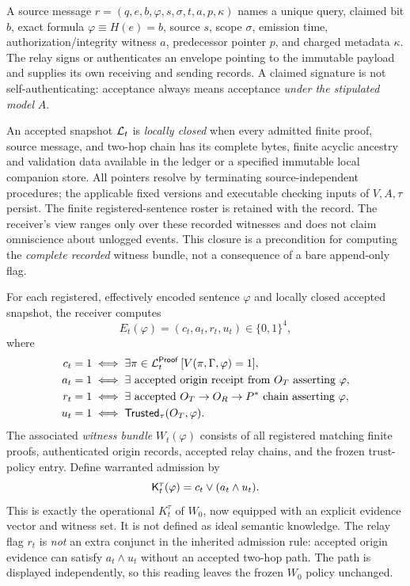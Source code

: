 \documentclass[11pt,letterpaper]{article}
\begin{document}
A source message $r=(q,e,b,\varphi,s,\sigma,t,a,p,\kappa)$ names a unique query, claimed bit $b$, exact formula $\varphi\equiv H(e)=b$, source $s$, scope $\sigma$, emission time, authorization/integrity witness $a$, predecessor pointer $p$, and charged metadata $\kappa$. The relay signs or authenticates an envelope pointing to the immutable payload and supplies its own receiving and sending records. A claimed signature is not self-authenticating: acceptance always means acceptance \emph{under the stipulated model} $A$.

\begin{definition}
An accepted snapshot $\mathcal L_t$ is \emph{locally closed} when every admitted finite proof, source message, and two-hop chain has its complete bytes, finite acyclic ancestry and validation data available in the ledger or a specified immutable local companion store. All pointers resolve by terminating source-independent procedures; the applicable fixed versions and executable checking inputs of $V,A,\tau$ persist. The finite registered-sentence roster is retained with the record. The receiver's view ranges only over these recorded witnesses and does not claim omniscience about unlogged events. This closure is a precondition for computing the \emph{complete recorded} witness bundle, not a consequence of a bare append-only flag.
\end{definition}

\begin{definition}
For each registered, effectively encoded sentence $\varphi$ and locally closed accepted snapshot, the receiver computes
\[
E_t(\varphi)=(c_t,a_t,r_t,u_t)\in\{0,1\}^4,
\]
where
\begin{align*}
c_t&=1\iff \exists\pi\in\mathcal L_t^{\mathsf{Proof}}\,[V(\pi,\Gamma,\varphi)=1],\\
a_t&=1\iff \exists\text{ accepted origin receipt from $O_T$ asserting }\varphi,\\
r_t&=1\iff \exists\text{ accepted $O_T\to O_R\to P^*$ chain asserting }\varphi,\\
u_t&=1\iff \mathsf{Trusted}_\tau(O_T,\varphi).
\end{align*}
The associated \emph{witness bundle} $W_t(\varphi)$ consists of all registered matching finite proofs, authenticated origin records, accepted relay chains, and the frozen trust-policy entry. Define warranted admission by
\[\mathsf{K}_t^\tau(\varphi)=c_t\lor(a_t\land u_t).\]
This is exactly the operational $K_t^\tau$ of $W_0$, now equipped with an explicit evidence vector and witness set. It is not defined as ideal semantic knowledge. The relay flag $r_t$ is \emph{not} an extra conjunct in the inherited admission rule: accepted origin evidence can satisfy $a_t\land u_t$ without an accepted two-hop path. The path is displayed independently, so this reading leaves the frozen $W_0$ policy unchanged.
\end{definition}
\end{document}
